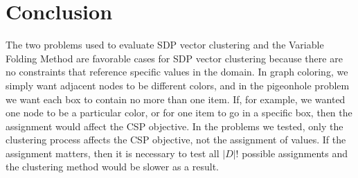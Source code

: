 \documentclass[11pt]{article} %
\begin{document}
\section{Conclusion}

The two problems used to evaluate SDP vector clustering and the Variable Folding Method are favorable cases for SDP vector clustering because there are no constraints that reference specific values in the domain. In graph coloring, we simply want adjacent nodes to be different colors, and in the pigeonhole problem we want each box to contain no more than one item. If, for example, we wanted one node to be a particular color, or for one item to go in a specific box, then the assignment would affect the CSP objective. In the problems we tested, only the clustering process affects the CSP objective, not the assignment of values. If the assignment matters, then it is necessary to test all $|D|!$ possible assignments and the clustering method would be slower as a result.

\renewcommand{\bibname}{References}


\end{document}
